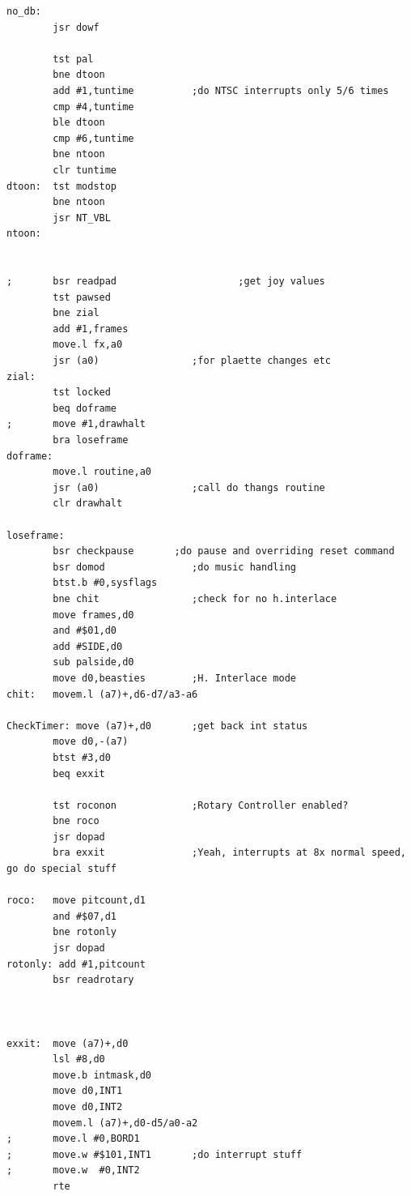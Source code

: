 \begin{lstlisting}
no_db:  
        jsr dowf

        tst pal
        bne dtoon
        add #1,tuntime          ;do NTSC interrupts only 5/6 times
        cmp #4,tuntime
        ble dtoon
        cmp #6,tuntime
        bne ntoon
        clr tuntime     
dtoon:  tst modstop
        bne ntoon
        jsr NT_VBL
ntoon:


;       bsr readpad                     ;get joy values
        tst pawsed
        bne zial
        add #1,frames 
        move.l fx,a0
        jsr (a0)                ;for plaette changes etc
zial:
        tst locked
        beq doframe
;       move #1,drawhalt
        bra loseframe
doframe: 
        move.l routine,a0
        jsr (a0)                ;call do thangs routine
        clr drawhalt

loseframe:
        bsr checkpause       ;do pause and overriding reset command
        bsr domod               ;do music handling      
        btst.b #0,sysflags
        bne chit                ;check for no h.interlace
        move frames,d0
        and #$01,d0
        add #SIDE,d0
        sub palside,d0
        move d0,beasties        ;H. Interlace mode
chit:   movem.l (a7)+,d6-d7/a3-a6

CheckTimer: move (a7)+,d0       ;get back int status
        move d0,-(a7)
        btst #3,d0
        beq exxit

        tst roconon             ;Rotary Controller enabled?
        bne roco
        jsr dopad
        bra exxit               ;Yeah, interrupts at 8x normal speed, go do special stuff

roco:   move pitcount,d1
        and #$07,d1
        bne rotonly
        jsr dopad
rotonly: add #1,pitcount
        bsr readrotary



exxit:  move (a7)+,d0
        lsl #8,d0
        move.b intmask,d0
        move d0,INT1
        move d0,INT2 
        movem.l (a7)+,d0-d5/a0-a2
;       move.l #0,BORD1
;       move.w #$101,INT1       ;do interrupt stuff
;       move.w  #0,INT2
        rte
\end{lstlisting}
